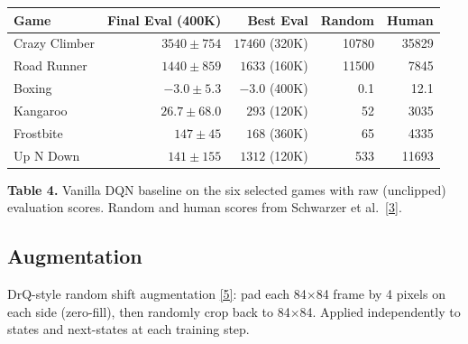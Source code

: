 \documentclass[11pt]{article}
\newcommand{\citelink}[2]{\href{#1}{\small[#2]}}
\begin{document}
\begin{table}[h]
\centering
\renewcommand{\arraystretch}{1.4}
\setlength{\tabcolsep}{8pt}
\begin{tabular}{l r r r r}
\toprule
\textbf{Game}
  & \textbf{Final Eval (400K)}
  & \textbf{Best Eval}
  & \textbf{Random}
  & \textbf{Human} \\
\midrule
Crazy Climber  & $3540 \pm 754$    & $17460$ (320K) & 10780 & 35829 \\
Road Runner    & $1440 \pm 859$    & $1633$ (160K)  & 11500 & 7845  \\
Boxing         & $-3.0 \pm 5.3$    & $-3.0$ (400K)  & 0.1   & 12.1  \\
Kangaroo       & $26.7 \pm 68.0$   & $293$ (120K)   & 52    & 3035  \\
Frostbite      & $147 \pm 45$      & $168$ (360K)   & 65    & 4335  \\
Up N Down      & $141 \pm 155$     & $1312$ (120K)  & 533   & 11693 \\
\bottomrule
\end{tabular}

\vspace{1.2em}
{\raggedright\small \textbf{Table 4.} Vanilla DQN baseline on the six
selected games with raw (unclipped) evaluation scores. Random and human
scores from Schwarzer et al.\ \citelink{https://arxiv.org/abs/2007.05929}{3}.\par}
\end{table}

\subsection{Augmentation}

DrQ-style random shift augmentation
\citelink{https://arxiv.org/abs/2004.14990}{5}: pad each 84$\times$84
frame by 4 pixels on each side (zero-fill), then randomly crop back to
84$\times$84. Applied independently to states and next-states at each
training step.
\end{document}
